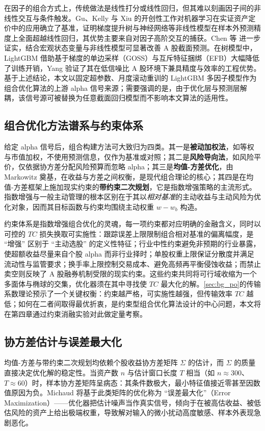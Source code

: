在因子的组合方式上，传统做法是线性打分或线性回归，但其难以刻画因子间的非线性交互与条件触发。Gu、Kelly 与 Xiu\cite{Gu2020} 的开创性工作对机器学习在实证资产定价中的应用确立了基准，证明梯度提升树与神经网络等非线性模型在样本外预测精度上全面超越线性回归，其优势主要来自对因子高阶交互的捕获。Chen 等\cite{Chen2024DeepLearningAP} 进一步证实，结合宏观状态变量与非线性模型可显著改善 A 股截面预测。在树模型中，LightGBM\cite{Ke2017LightGBM} 借助基于梯度的单边采样（GOSS）与互斥特征捆绑（EFB）大幅降低了训练开销，Yang\cite{Yang2025} 验证了其在低信噪比 A 股环境下兼具精度与效率的工程优势。基于上述结论，本文以固定超参数、月度滚动重训的 LightGBM 多因子模型作为组合优化算法的上游 alpha 信号来源；需要强调的是，由于优化层与预测层解耦，该信号源可被替换为任意截面回归模型而不影响本文算法的适用性。

\subsection{组合优化方法谱系与约束体系}
给定 alpha 信号后，组合构建方法可大致归为四类。其一是\textbf{被动加权法}，如等权与市值加权，不使用预测信息，仅作为基准或对照；其二是\textbf{风险导向法}，如风险平价，仅依据协方差分配风险预算而忽略 alpha；其三是\textbf{均值-方差优化}，由 Markowitz 奠基，在收益与方差之间权衡，是现代组合理论的核心；其四是在均值-方差框架上施加现实约束的\textbf{带约束二次规划}，它是指数增强策略的主流形式。指数增强与一般主动管理的根本区别在于其以\emph{相对基准}的主动收益与主动风险为优化对象，因而其目标函数与约束均围绕主动权重 $w-w_b$ 构造。

约束体系是指数增强组合优化的灵魂，每一项约束都对应明确的金融含义，同时以可控的 $TC$ 损失换取可实施性：跟踪误差上限限制组合相对基准的偏离幅度，是 ``增强'' 区别于 ``主动选股'' 的定义性特征；行业中性约束避免非预期的行业暴露，使超额收益尽量来自个股 alpha 而非行业择时；单股权重上限保证分散度并满足流动性与监管要求；换手率上限控制交易成本、避免高频再平衡侵蚀收益；而禁止卖空则反映了 A 股融券机制受限的现实约束。这些约束共同将可行域收缩为一个多面体与椭球的交集，优化器须在其中寻找使 $TC$ 最大化的解。\ref{sec:bg_po}的传输系数理论预示了一个关键权衡：约束越严格，可实施性越强，但传输效率 $TC$ 越低；如何在二者间取得最优折衷，是约束型组合优化算法设计的中心问题，本文将在第四章通过约束消融实验对此做定量考察。

\subsection{协方差估计与误差最大化}
均值-方差与带约束二次规划均依赖个股收益协方差矩阵 $\Sigma$ 的估计，而 $\Sigma$ 的质量直接决定优化解的稳定性。当资产数 $n$ 与估计窗口长度 $T$ 相当（如 $n\approx 300$、$T\approx 60$）时，样本协方差矩阵呈病态：其条件数极大，最小特征值接近零甚至因数值原因为负。Michaud\cite{Michaud1989} 将基于此类矩阵的优化称为 ``误差最大化''（Error Maximization）——优化器把估计噪声当作真实信号，倾向于在被高估收益、被低估风险的资产上给出极端权重，导致解对输入的微小扰动高度敏感、样本外表现急剧恶化。

